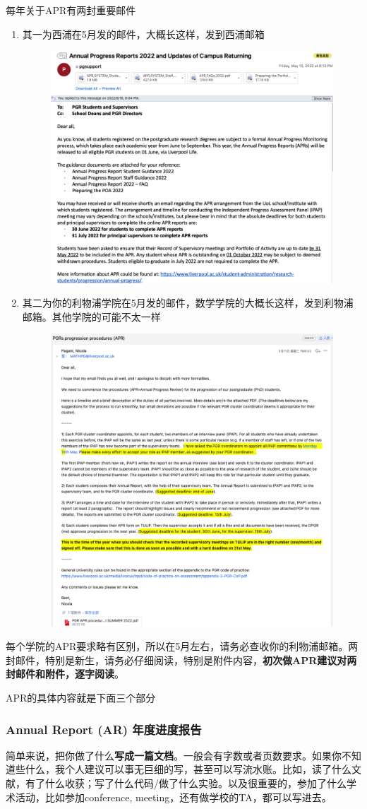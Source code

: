 每年关于APR有两封重要邮件
\begin{enumerate}
    \item 其一为西浦在5月发的邮件，大概长这样，发到西浦邮箱
    \begin{figure}[H]
        \centering
        \includegraphics[width=0.5\columnwidth]{author-folder/Kai.Wu/APR_email.png}
    \end{figure}
    \item 其二为你的利物浦学院在5月发的邮件，数学学院的大概长这样，发到利物浦邮箱。其他学院的可能不太一样
    \begin{figure}[H]
        \centering
        \includegraphics[width=0.5\columnwidth]{author-folder/Kai.Wu/APR_liverpool_email.png}
    \end{figure}
\end{enumerate}

每个学院的APR要求略有区别，所以在5月左右，请务必查收你的利物浦邮箱。两封邮件，特别是新生，请务必仔细阅读，特别是附件内容，\textbf{初次做APR建议对两封邮件和附件，逐字阅读}。

APR的具体内容就是下面三个部分
\subsubsection{Annual Report (AR) 年度进度报告}
简单来说，把你做了什么\textbf{写成一篇文档}。一般会有字数或者页数要求。如果你不知道些什么，我个人建议可以事无巨细的写，甚至可以写流水账。比如，读了什么文献，有了什么收获；写了什么代码/做了什么实验。以及很重要的，参加了什么学术活动，比如参加conference, meeting，还有做学校的TA，都可以写进去。
